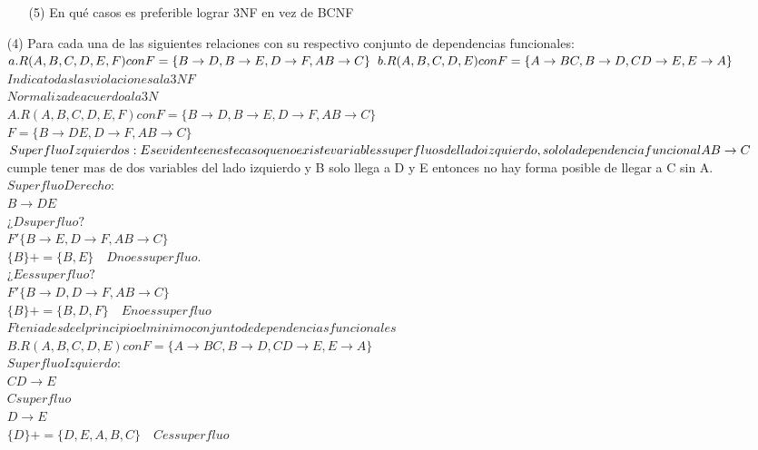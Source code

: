 \documentclass{article}
\begin{document}
\begin{enumerate}
\begin{enumerate}
    \item[(5)] En qué casos es preferible lograr 3NF en vez de BCNF
  \end{enumerate}
\item[(4)] Para cada una de las siguientes relaciones con su respectivo conjunto de dependencias funcionales:\\
$a. R(A,B,C,D,E,F) con F = \{B\rightarrow D, B \rightarrow E, D \rightarrow F, AB \rightarrow C\}\\$
$b. R(A,B,C,D,E) con F = \{A \rightarrow BC, B \rightarrow D, CD \rightarrow E, E \rightarrow A\}\\$
$Indica todas las violaciones a la 3NF$\\
$Normaliza de acuerdo a la 3N$\\
$A.  R(A,B,C,D,E,F) con F = \{B \rightarrow D, B \rightarrow E, D \rightarrow F, AB \rightarrow C\}$\\
$F=\{B \rightarrow DE, D \rightarrow F, AB \rightarrow C\}$\\
$Superfluo Izquierdos:\\
Es evidente en este caso que no existe variables superfluos del lado izquierdo, solo la dependencia funcional AB \rightarrow C$  cumple tener mas de dos variables del lado izquierdo y B solo llega a D y E entonces no hay forma posible de llegar a C sin A.\\
$Superfluo Derecho:$\\
$B \rightarrow DE$\\
$¿D superfluo?$\\
$F'\{B \rightarrow E, D \rightarrow F, AB \rightarrow C\}$\\
$\{B\}+=\{B,E\} \quad D no es superfluo.$\\
$¿E es superfluo?$\\
$F'\{B \rightarrow D, D \rightarrow F, AB \rightarrow C\}$\\
$\{B\}+=\{B,D,F\} \quad E no es superfluo$\\
$F tenia desde el principio el minimo conjunto de dependencias funcionales$\\
$B. R(A,B,C,D,E) con F = \{A \rightarrow BC, B \rightarrow D, CD \rightarrow E, E \rightarrow A\}$\\
$Superfluo Izquierdo:$\\
$CD \rightarrow E$ \\
$C superfluo$\\
$D \rightarrow E$\\
$\{D\}+=\{D,E,A,B,C\} \quad C es superfluo$\\

\end{enumerate}
\end{document}
